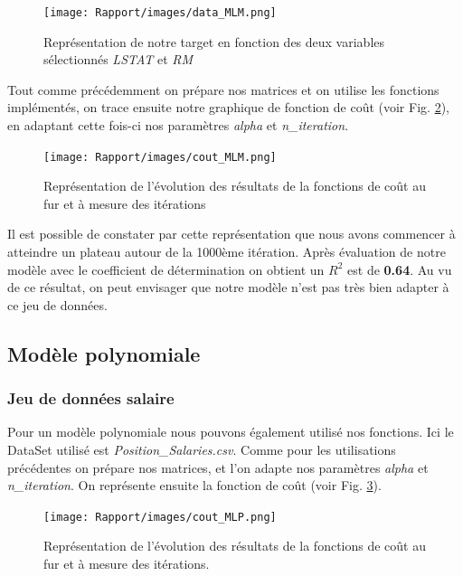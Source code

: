 \documentclass[french]{article}
\begin{document}
\begin{figure}[!htbp]
    \centering
    \texttt{[image: Rapport/images/data\_MLM.png]}
    \caption{Représentation de notre target en fonction des deux variables sélectionnés \textit{LSTAT} et \textit{RM}}
    \label{fig:boston_data}
\end{figure}

\noindent Tout comme précédemment on prépare nos matrices et on utilise les fonctions implémentés, on trace ensuite notre graphique de fonction de coût (voir Fig. \ref{fig:cout_MLM}), en adaptant cette fois-ci nos paramètres \textit{alpha} et \textit{n\_iteration}.\\

\begin{figure}[!htbp]
    \centering
    \texttt{[image: Rapport/images/cout\_MLM.png]}
    \caption{Représentation de l'évolution des résultats de la fonctions de coût au fur et à mesure des itérations}
    \label{fig:cout_MLM}
\end{figure}

\noindent Il est possible de constater par cette représentation que nous avons commencer à atteindre un plateau autour de la 1000ème itération. Après évaluation de notre modèle avec le coefficient de détermination on obtient un $R^{2}$ est de \textbf{0.64}. Au vu de ce résultat, on peut envisager que notre modèle n'est pas très bien adapter à ce jeu de données.

\subsection{Modèle polynomiale}

\subsubsection{Jeu de données salaire}

Pour un modèle polynomiale nous pouvons également utilisé nos fonctions. Ici le DataSet utilisé est \textit{Position\_Salaries.csv}. Comme pour les utilisations précédentes on prépare nos matrices, et l'on adapte nos paramètres \textit{alpha} et \textit{n\_iteration}. On représente ensuite la fonction de coût (voir Fig. \ref{fig:cout_MLP}).\\

\begin{figure}[!htbp]
    \centering
    \texttt{[image: Rapport/images/cout\_MLP.png]}
    \caption{Représentation de l'évolution des résultats de la fonctions de coût au fur et à mesure des itérations.}
    \label{fig:cout_MLP}
\end{figure}
\end{document}
